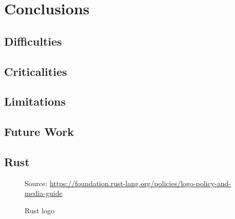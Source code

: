 \chapter{Conclusions}
\label{cha:conclusions}


\section{Difficulties}
\label{sec:conclusions_difficulties}

\section{Criticalities}
\label{sec:conclusions_criticalities}

\section{Limitations}
\label{sec:conclusions_limitations}

\section{Future Work}
\label{sec:conclusions_future_work}




\section{Rust}
\label{sec:conclusions_rust}

\begin{figure} %
  \centering
  \def\stackalignment{r} %
  {\scriptsize \parbox[t]{\linewidth}{ Source: \url{https://foundation.rust-lang.org/policies/logo-policy-and-media-guide}} }
  \caption{Rust logo}
\end{figure}